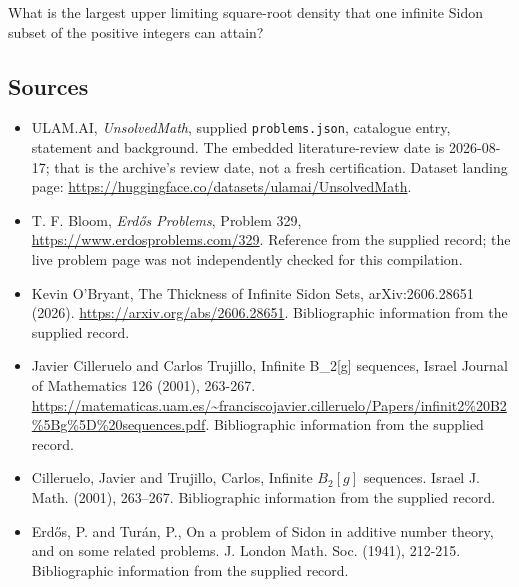 \documentclass[11pt,a4paper]{article}
\begin{document}
What is the largest upper limiting square-root density that one infinite Sidon subset of the positive integers can attain?

\subsection{Sources}

{\small

\begin{itemize}

\item[\hypertarget{source:statement:1}{S1}] ULAM.AI, \emph{UnsolvedMath}, supplied \texttt{problems.json}, catalogue entry, statement and background. The embedded literature-review date is 2026-08-17; that is the archive’s review date, not a fresh certification. Dataset landing page: \url{https://huggingface.co/datasets/ulamai/UnsolvedMath}.

\item[\hypertarget{source:statement:2}{S2}] T. F. Bloom, \emph{Erdős Problems}, Problem 329, \url{https://www.erdosproblems.com/329}. Reference from the supplied record; the live problem page was not independently checked for this compilation.

\item[\hypertarget{source:statement:3}{S3}] Kevin O'Bryant, The Thickness of Infinite Sidon Sets, arXiv:2606.28651 (2026). \url{https://arxiv.org/abs/2606.28651}. Bibliographic information from the supplied record.

\item[\hypertarget{source:statement:4}{S4}] Javier Cilleruelo and Carlos Trujillo, Infinite B\_2[g] sequences, Israel Journal of Mathematics 126 (2001), 263-267. \url{https://matematicas.uam.es/~franciscojavier.cilleruelo/Papers/infinit2%20B2%5Bg%5D%20sequences.pdf}. Bibliographic information from the supplied record.

\item[\hypertarget{source:statement:5}{S5}] Cilleruelo, Javier and Trujillo, Carlos, Infinite {$B_2[g]$} sequences. Israel J. Math. (2001), 263--267. Bibliographic information from the supplied record.

\item[\hypertarget{source:statement:6}{S6}] Erd\H{o}s, P. and Tur\'{a}n, P., On a problem of Sidon in additive number theory, and on some related problems. J. London Math. Soc. (1941), 212-215. Bibliographic information from the supplied record.

\end{itemize}

}

\label{end:statement}
\end{document}
